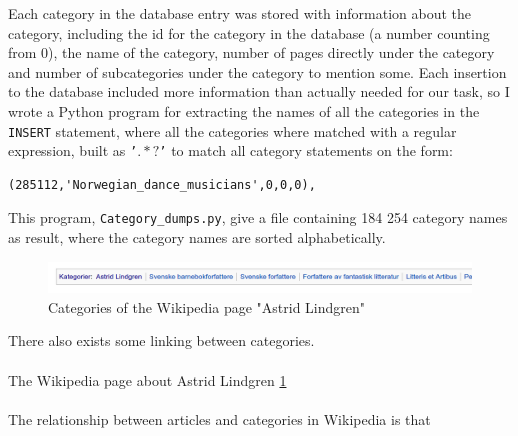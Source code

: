 \documentclass[11pt,english,a4paper]{article}
\begin{document}

Each category in the database entry was stored with information about the category, including the id for the category in the database (a number counting from 0), the name of the category, number of pages directly under the category and number of subcategories under the category to mention some. Each insertion to the database included more information than actually needed for our task, so I wrote a Python program for extracting the names of all the categories in the \texttt{INSERT} statement, where all the categories where matched with a regular expression, built as \texttt{'\(.*?\)'} to match all category statements on the form: 
\begin{verbatim}
(285112,'Norwegian_dance_musicians',0,0,0),
\end{verbatim}
This program, \texttt{Category\_dumps.py}, give a file containing 184 254 category names as result, where the category names are sorted alphabetically. 





\newpage




\begin{figure}
\centering
\includegraphics[width=\textwidth]{Dumps/imgs/Astrid-Lindgren-Wikipage-short.png}
\caption{Categories of the Wikipedia page "Astrid Lindgren"}
\label{fig: wikipage_lindgren}
\end{figure}

There also exists some linking between categories. \\\\

The Wikipedia page about Astrid Lindgren \ref{fig: wikipage_lindgren}\\\\

The relationship between articles and categories in Wikipedia is that \\\\
\end{document}
